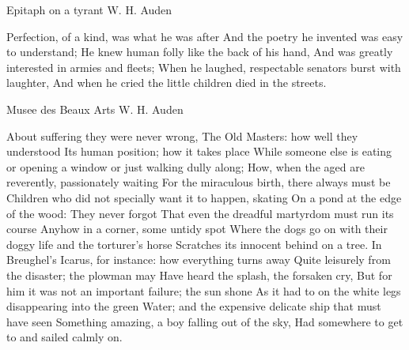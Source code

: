 \begin{poem}
{Epitaph on a tyrant}
{W. H. Auden}

 Perfection, of a kind, was what he was after
 And the poetry he invented was easy to understand;
 He knew human folly like the back of his hand,
 And was greatly interested in armies and fleets;
 When he laughed, respectable senators burst with laughter,
 And when he cried the little children died in the streets.

\end{poem}

\begin{poem}
{Musee des Beaux Arts}
{W. H. Auden}

           About suffering they were never wrong,
           The Old Masters: how well they understood
           Its human position; how it takes place
           While someone else is eating or opening a window or just walking dully along;
           How, when the aged are reverently, passionately waiting
           For the miraculous birth, there always must be
           Children who did not specially want it to happen, skating
           On a pond at the edge of the wood:
           They never forgot
           That even the dreadful martyrdom must run its course
           Anyhow in a corner, some untidy spot
           Where the dogs go on with their doggy life and the torturer's horse
           Scratches its innocent behind on a tree.
           In Breughel's Icarus, for instance: how everything turns away
           Quite leisurely from the disaster; the plowman may
           Have heard the splash, the forsaken cry,
           But for him it was not an important failure; the sun shone
           As it had to on the white legs disappearing into the green
           Water; and the expensive delicate ship that must have seen
           Something amazing, a boy falling out of the sky,
           Had somewhere to get to and sailed calmly on.

\end{poem}


